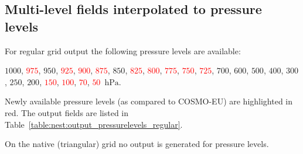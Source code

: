 \subsection{Multi-level fields interpolated to pressure levels}

\renewcommand{\new}[1]{\textcolor{red}{#1}}
%
%
\renewcommand{\pressurelevelsRegular}{$1000$, \new{$975$}, $950$, \new{$925$}, \new{$900$}, 
                                    \new{$875$}, $850$, \new{$825$}, \new{$800$}, 
                                    \new{$775$}, \new{$750$}, \new{$725$}, $700$, $600$, 
                                    $500$, $400$, $300$, $250$, $200$, \new{$150$}, \new{$100$}, 
                                    \new{$70$}, \new{$50$}~$\mathrm{hPa}$}

For regular grid output the following pressure levels are available: 
\begin{center}
\begin{minipage}{0.5\linewidth}
\pressurelevelsRegular. 
\end{minipage}
\end{center}

Newly available pressure levels (as compared to COSMO-EU) are highlighted in red. 
The output fields are listed in Table~\ref{table:nest:output_pressurelevels_regular}.

On the native (triangular) grid no output is generated for pressure levels.

\renewcommand{\new}[1]{#1}

